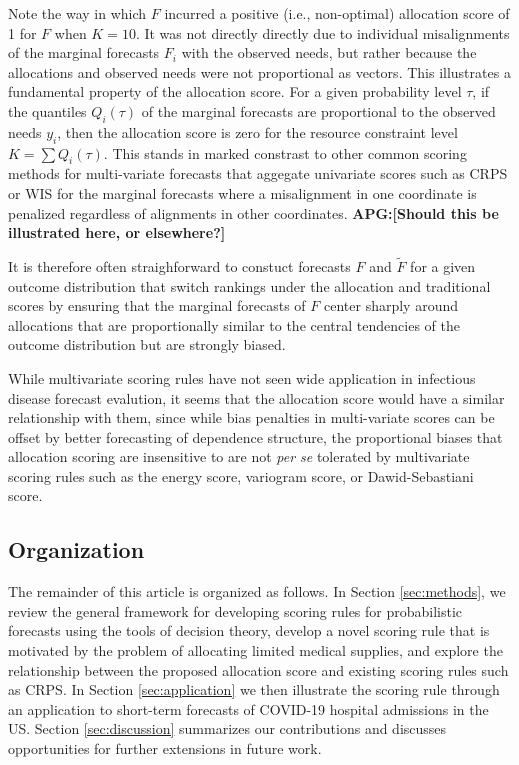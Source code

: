 \documentclass{article}
\def\apg#1{{\color{red}\textbf{APG:[#1]}}}
\begin{document}
Note the way in which $F$ incurred a positive (i.e., non-optimal) allocation score of 1 for $F$ when $K = 10$. It was not directly directly due to individual misalignments 
of the marginal forecasts $F_i$ with the observed needs, but rather because the allocations and observed needs were not proportional as vectors.
This illustrates a fundamental property of the allocation score.  For a given probability level $\tau$, if the quantiles $Q_i(\tau)$ of the marginal forecasts
are proportional to the observed needs $y_i$, then the allocation score is zero for the resource constraint level $K = \sum Q_i(\tau)$. This stands in marked constrast to other common scoring methods for multi-variate forecasts that aggegate univariate scores such as CRPS or WIS for the marginal forecasts where a 
misalignment in one coordinate is penalized regardless of alignments in other coordinates. \apg{Should this be illustrated here, or elsewhere?}

It is therefore often straighforward to constuct forecasts $F$ and $\widetilde{F}$ for a given outcome distribution that switch rankings under the allocation and traditional scores by ensuring that the marginal forecasts of $F$ center sharply around allocations that are proportionally similar to the central tendencies of the outcome distribution but are strongly biased.

While multivariate scoring rules have not seen wide application in infectious disease forecast evalution, it seems that the allocation score would have a similar relationship with them, since while bias penalties in multi-variate scores can be offset by better forecasting of dependence structure, the proportional biases that allocation scoring are insensitive to are not \emph{per se} tolerated by multivariate scoring rules such as the energy score, variogram score, or Dawid-Sebastiani score. 

\subsection{Organization}

The remainder of this article is organized as follows. 
In Section \ref{sec:methods}, we review the general framework for developing scoring rules for probabilistic forecasts using the tools of decision theory, develop a novel scoring rule that is motivated by the problem of allocating limited medical supplies, and explore the relationship between the proposed allocation score and existing scoring rules such as CRPS. 
In Section \ref{sec:application} we then illustrate the scoring rule through an application to short-term forecasts of COVID-19 hospital admissions in the US. 
Section \ref{sec:discussion} summarizes our contributions and discusses opportunities for further extensions in future work.
\end{document}
